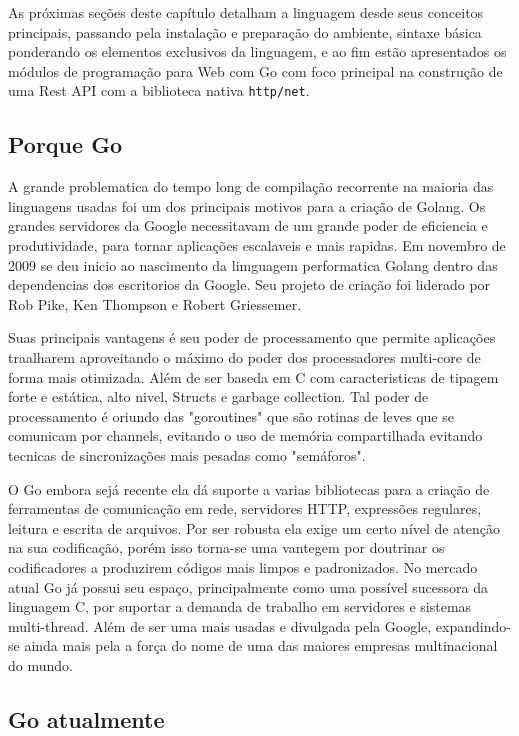 \documentclass{SBCbookchapter}
\begin{document}
As próximas seções deste capítulo detalham a linguagem desde seus conceitos principais, passando pela instalação e preparação do ambiente, sintaxe básica ponderando os elementos exclusivos da linguagem, e ao fim estão apresentados os módulos de programação para Web com Go com foco principal na construção de uma Rest API com a biblioteca nativa \texttt{http/net}.

\subsection{Porque Go}

A grande problematica do tempo long de compilação recorrente na maioria das linguagens usadas foi um dos principais motivos para a criação de Golang. Os grandes servidores da Google necessitavam de um grande poder de eficiencia e produtividade, para tornar aplicações escalaveis e mais rapidas. Em novembro de 2009 se deu inicio ao nascimento da limguagem performatica Golang dentro das dependencias dos escritorios da Google. Seu projeto de criação foi liderado por Rob Pike, Ken Thompson e Robert Griessemer.

Suas principais vantagens é seu poder de processamento que permite aplicações traalharem aproveitando o máximo do poder dos processadores multi-core de forma mais otimizada. Além de ser baseda em C com caracteristicas de tipagem forte e estática, alto nivel, Structs e garbage collection. Tal poder de processamento é oriundo das "goroutines" que são rotinas de leves que se comunicam por channels, evitando o uso de memória compartilhada evitando tecnicas de sincronizações mais pesadas como "semáforos".


O Go embora sejá recente ela dá suporte a varias bibliotecas para a criação de ferramentas de comunicação em rede, servidores HTTP, expressões regulares, leitura e escrita de arquivos. Por ser robusta ela exige um certo nível de atenção na sua codificação, porém isso torna-se uma vantegem por doutrinar os codificadores a produzirem códigos mais limpos e padronizados. No mercado atual Go já possui seu espaço, principalmente como uma possível sucessora da linguagem C, por suportar a demanda de trabalho em servidores e sistemas multi-thread. Além de ser uma mais usadas e divulgada pela Google, expandindo-se ainda mais pela a força do nome de uma das maiores empresas multinacional do mundo. 

\subsection{Go atualmente}
\end{document}
